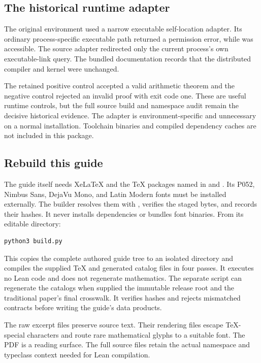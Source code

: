 \subsection{The historical runtime adapter}
The original environment used a narrow executable self-location adapter. Its ordinary process-specific executable path returned a permission error, while  was accessible. The source adapter redirected only the current process's own executable-link query. The bundled documentation records that the distributed compiler and kernel were unchanged.

The retained positive control accepted a valid arithmetic theorem and the negative control rejected an invalid proof with exit code one. These are useful runtime controls, but the full source build and namespace audit remain the decisive historical evidence. The adapter is environment-specific and unnecessary on a normal installation. Toolchain binaries and compiled dependency caches are not included in this package.

\subsection{Rebuild this guide}
The guide itself needs XeLaTeX and the TeX packages named in  and . Its P052, Nimbus Sans, DejaVu Mono, and Latin Modern fonts must be installed externally. The builder resolves them with , verifies the staged bytes, and records their hashes. It never installs dependencies or bundles font binaries. From its editable directory:
\begin{Verbatim}[fontsize=\small,frame=leftline,breaklines=true]
python3 build.py
\end{Verbatim}
This copies the complete authored guide tree to an isolated directory and compiles the supplied TeX and generated catalog files in four passes. It executes no Lean code and does not regenerate mathematics. The separate  script can regenerate the catalogs when supplied the immutable release root and the traditional paper's final crosswalk. It verifies hashes and rejects mismatched contracts before writing the guide's data products.

The raw excerpt files preserve source text. Their rendering files escape TeX-special characters and route rare mathematical glyphs to a suitable font. The PDF is a reading surface. The full source files retain the actual namespace and typeclass context needed for Lean compilation.

